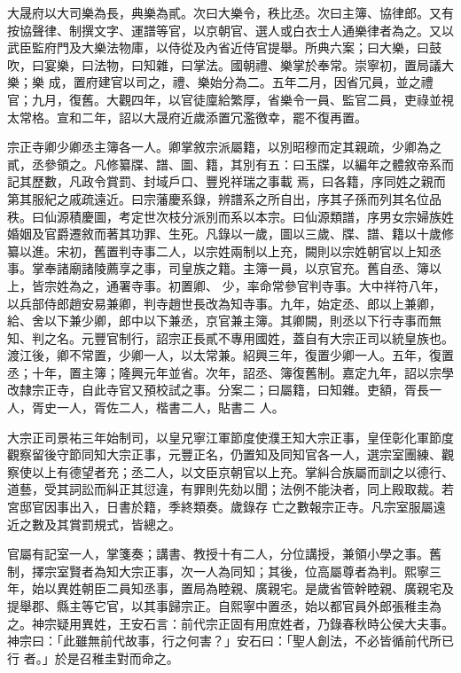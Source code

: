 \begin{pinyinscope}
 大晟府以大司樂為長，典樂為貳。次曰大樂令，秩比丞。次曰主簿、協律郎。又有按協聲律、制撰文字、運譜等官，以京朝官、選人或白衣士人通樂律者為之。又以武臣監府門及大樂法物庫，以侍從及內省近侍官提舉。所典六案；曰大樂，曰鼓吹，曰宴樂，曰法物，曰知雜，曰掌法。國朝禮、樂掌於奉常。崇寧初，置局議大樂；樂
 成，置府建官以司之，禮、樂始分為二。五年二月，因省冗員，並之禮官；九月，復舊。大觀四年，以官徒廩給繁厚，省樂令一員、監官二員，吏祿並視太常格。宣和二年，詔以大晟府近歲添置冗濫徼幸，罷不復再置。



 宗正寺卿少卿丞主簿各一人。卿掌敘宗派屬籍，以別昭穆而定其親疏，少卿為之貳，丞參領之。凡修纂牒、譜、圖、籍，其別有五：曰玉牒，以編年之體敘帝系而記其歷數，凡政令賞罰、封域戶口、豐兇祥瑞之事載
 焉，曰各籍，序同姓之親而第其服紀之戚疏遠近。曰宗藩慶系錄，辨譜系之所自出，序其子孫而列其名位品秩。曰仙源積慶圖，考定世次枝分派別而系以本宗。曰仙源類譜，序男女宗婦族姓婚姻及官爵遷敘而著其功罪、生死。凡錄以一歲，圖以三歲、牒、譜、籍以十歲修纂以進。宋初，舊置判寺事二人，以宗姓兩制以上充，闕則以宗姓朝官以上知丞事。掌奉諸廟諸陵薦享之事，司皇族之籍。主簿一員，以京官充。舊自丞、簿以上，皆宗姓為之，通署寺事。初置卿、
 少，率命常參官判寺事。大中祥符八年，以兵部侍郎趙安易兼卿，判寺趙世長改為知寺事。九年，始定丞、郎以上兼卿，給、舍以下兼少卿，郎中以下兼丞，京官兼主簿。其卿闕，則丞以下行寺事而無知、判之名。元豐官制行，詔宗正長貳不專用國姓，蓋自有大宗正司以統皇族也。渡江後，卿不常置，少卿一人，以太常兼。紹興三年，復置少卿一人。五年，復置丞；十年，置主簿；隆興元年並省。次年，詔丞、簿復舊制。嘉定九年，詔以宗學改隸宗正寺，自此寺官又預校試之事。分案二；曰屬籍，曰知雜。吏額，胥長一人，胥史一人，胥佐二人，楷書二人，貼書二
 人。



 大宗正司景祐三年始制司，以皇兄寧江軍節度使濮王知大宗正事，皇侄彰化軍節度觀察留後守節同知大宗正事，元豐正名，仍置知及同知官各一人，選宗室團練、觀察使以上有德望者充；丞二人，以文臣京朝官以上充。掌糾合族屬而訓之以德行、道藝，受其詞訟而糾正其愆違，有罪則先劾以聞；法例不能決者，同上殿取裁。若宮邸官因事出入，日書於籍，季終類奏。歲錄存
 亡之數報宗正寺。凡宗室服屬遠近之數及其賞罰規式，皆總之。



 官屬有記室一人，掌箋奏；講書、教授十有二人，分位講授，兼領小學之事。舊制，擇宗室賢者為知大宗正事，次一人為同知；其後，位高屬尊者為判。熙寧三年，始以異姓朝臣二員知丞事，置局為睦親、廣親宅。是歲省管幹睦親、廣親宅及提舉郡、縣主等它官，以其事歸宗正。自熙寧中置丞，始以都官員外郎張稚圭為之。神宗疑用異姓，王安石言：前代宗正固有用庶姓者，乃錄春秋時公侯大夫事。神宗曰：「此雖無前代故事，行之何害？」安石曰：「聖人創法，不必皆循前代所已行
 者。」於是召稚圭對而命之。




\end{pinyinscope}
